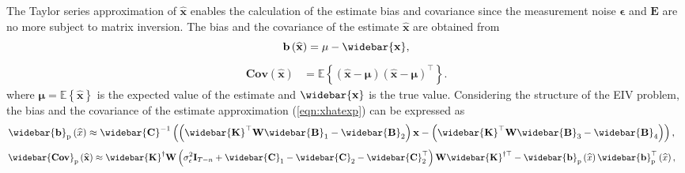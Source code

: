The Taylor series approximation of $\widehat{\mathbf{x}}$ enables the calculation of the estimate bias and covariance since the measurement noise $\bm{\epsilon}$ and $\mathbf{E}$ are no more subject to matrix inversion. 
The bias and the covariance of the estimate $\widehat{\mathbf{x}}$ are obtained from
\begin{equation}  \mathbf{b} \left(\widehat{\mathbf{x}} \right) = \mathbf{\mu} - \widebar{\mathbf{x}}, \label{eqn:biasdef} \end{equation}
\begin{equation} \begin{aligned} \mathrm{\mathbf{Cov}} \left( \widehat{\mathbf{x}} \right) & = \mathbb{E} \left\{ \left( \widehat{\mathbf{x}} - \mathbf{\mu} \right)  \left( \widehat{\mathbf{x}} - \mathbf{\mu} \right)^\top \right\} . \end{aligned} \label{eqn:covdef} \end{equation} 
where $\mathbf{\mu} = \mathbb{E} \left\{ \widehat{\mathbf{x}} \right\}$ is the expected value of the estimate and $\widebar{\mathbf{x}}$ is the true value. 
Considering the structure of the EIV problem, the bias and the covariance of the estimate approximation (\ref{eqn:xhatexp}) can be expressed as
\begin{equation} \begin{aligned} \widebar{\mathbf{b}}_{\mathrm{p}} \left( \widehat{x} \right) & \approx \widebar{\mathbf{C}}^{-1} \left(  \left( \widebar{\mathbf{K}}^\top \mathbf{W} \widebar{\mathbf{B}}_1 - \widebar{\mathbf{B}}_2 \right) \mathbf{x} - \left( \widebar{\mathbf{K}}^\top \mathbf{W} \widebar{\mathbf{B}}_3 - \widebar{\mathbf{B}}_4 \right) \right), \end{aligned} \label{eqn:biasE} \end{equation}
\begin{equation} \begin{aligned} \widebar{\mathrm{\mathbf{Cov}}}_{\mathrm{p}} \left( \widehat{\mathbf{x}} \right) & \approx \widebar{\mathbf{K}}^\dagger \mathbf{W} \left( \sigma_{\epsilon}^2 \mathbf{I}_{T-n} + \widebar{\mathbf{C}}_1 - \widebar{\mathbf{C}}_2 - \widebar{\mathbf{C}}_2^\top \right) \mathbf{W} \widebar{\mathbf{K}}^{\dagger \top}  - \widebar{\mathbf{b}}_{\mathrm{p}} \left( \widehat{x} \right) \widebar{\mathbf{b}}_{\mathrm{p}}^\top \left( \widehat{x} \right), \end{aligned} \label{eqn:varE} \end{equation}

